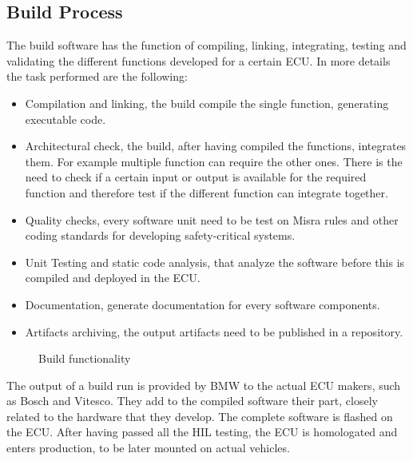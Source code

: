 \documentclass[../main.tex]{subfiles}
\begin{document}
\subsection{Build Process}
\label{subsection:Build process}
The build software has the function of compiling, linking, integrating, testing and validating the different functions developed for a certain ECU. In more details the task performed are the following:
\begin{itemize}
    \item Compilation and linking, the build compile the single function, generating executable code. 
    \item Architectural check, the build, after having compiled the functions, integrates them. For example multiple function can require the other ones. There is the need to check if a certain input or output is available for the required function and therefore test if the different function can integrate together.
    \item Quality checks, every software unit need to be test on Misra rules and other coding standards for developing safety-critical systems.
    \item Unit Testing and static code analysis, that analyze the software before this is compiled and deployed in the ECU.
    \item Documentation, generate documentation for every software components. 
    \item Artifacts archiving, the output artifacts need to be published in a repository.
\end{itemize}
\begin{figure}[H]
    \centering
    \caption{Build functionality}
    \label{fig:buildfucntionality}
\end{figure}
The output of a build run is provided by BMW to the actual ECU makers, such as Bosch and Vitesco. They add to the compiled software their part, closely related to the hardware that they develop. The complete software is flashed on the ECU. After having passed all the HIL testing, the ECU is homologated and enters production, to be later mounted on actual vehicles.
\end{document}
